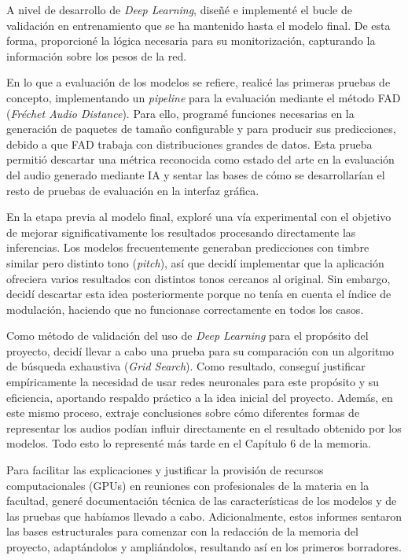 A nivel de desarrollo de \textit{Deep Learning}, diseñé e implementé el bucle de validación en entrenamiento que se ha mantenido hasta el modelo final. De esta forma, proporcioné la lógica necesaria para su monitorización, capturando la información sobre los pesos de la red. 

En lo que a evaluación de los modelos se refiere, realicé las primeras pruebas de concepto, implementando un \textit{pipeline} para la evaluación mediante el método FAD (\textit{Fréchet Audio Distance}). Para ello, programé funciones necesarias en la generación de paquetes de tamaño configurable y para producir sus predicciones, debido a que FAD trabaja con distribuciones grandes de datos. Esta prueba permitió descartar una métrica reconocida como estado del arte en la evaluación del audio generado mediante IA y sentar las bases de cómo se desarrollarían el resto de pruebas de evaluación en la interfaz gráfica.

En la etapa previa al modelo final, exploré una vía experimental con el objetivo de mejorar significativamente los resultados procesando directamente las inferencias. Los modelos frecuentemente generaban predicciones con timbre similar pero distinto tono (\textit{pitch}), así que decidí implementar que la aplicación ofreciera varios resultados con distintos tonos cercanos al original. Sin embargo, decidí descartar esta idea posteriormente porque no tenía en cuenta el índice de modulación, haciendo que no funcionase correctamente en todos los casos.

Como método de validación del uso de \textit{Deep Learning} para el propósito del proyecto, decidí llevar a cabo una prueba para su comparación con un algoritmo de búsqueda exhaustiva (\textit{Grid Search}). Como resultado, conseguí justificar empíricamente la necesidad de usar redes neuronales para este propósito y su eficiencia, aportando respaldo práctico a la idea inicial del proyecto. Además, en este mismo proceso, extraje conclusiones sobre cómo diferentes formas de representar los audios podían influir directamente en el resultado obtenido por los modelos. Todo esto lo representé más tarde en el Capítulo 6 de la memoria. 

Para facilitar las explicaciones y justificar la provisión de recursos computacionales (GPUs) en reuniones con profesionales de la materia en la facultad, generé documentación técnica de las características de los modelos y de las pruebas que habíamos llevado a cabo. Adicionalmente, estos informes sentaron las bases estructurales para comenzar con la redacción de la memoria del proyecto, adaptándolos y ampliándolos, resultando así en los primeros borradores. 

